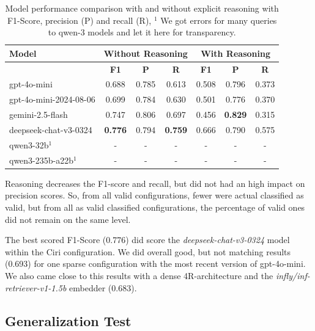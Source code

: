 
\begin{table}[h]
    \centering
    \begin{tabular}{|l|c|c|c|c|c|c|}
        \hline
        \textbf{Model} & \multicolumn{3}{c|}{\textbf{Without Reasoning}} & \multicolumn{3}{c|}{\textbf{With Reasoning}} \\
        \hline
        & \textbf{F1} & \textbf{P} & \textbf{R} & \textbf{F1} &  \textbf{P} & \textbf{R} \\
        \hline
        gpt-4o-mini             & 0.688 & 0.785 & 0.613 & 0.508 & 0.796 & 0.373 \\
        gpt-4o-mini-2024-08-06  & 0.699 & 0.784 & 0.630 & 0.501 & 0.776 & 0.370\\
        gemini-2.5-flash        & 0.747 & 0.806 & 0.697 & 0.456 & \textbf{0.829} & 0.315 \\
        deepseek-chat-v3-0324   & \textbf{0.776} & 0.794 & \textbf{0.759} & 0.666 & 0.790 & 0.575 \\
        qwen3-32b$^1$ & - & - & - & - & - & - \\
        qwen3-235b-a22b$^1$ & - & - & - & - & - & - \\
        \hline
    \end{tabular}
    \caption{Model performance comparison with and without explicit reasoning with F1-Score, precision (P) and recall (R), $^1$ We got errors for many queries to qwen-3 models and let it here for transparency.}
    \label{tab:model_comparison}
\end{table}

Reasoning decreases the F1-score and recall, but did not had an high impact on precision scores. So, from all valid configurations, fewer were actual classified as valid, but from all as valid classified configurations, the percentage of valid ones did not remain on the same level.

The best scored F1-Score (0.776) did score the \textit{deepseek-chat-v3-0324} model within the Ciri configuration. We did overall good, but not matching results (0.693) for one sparse configuration with the most recent version of gpt-4o-mini. We also came close to this results with a dense 4R-architecture and the \textit{infly/inf-retriever-v1-1.5b} embedder (0.683). 



\subsection{Generalization Test} \label{sec:exp_generalization}

